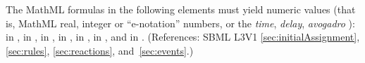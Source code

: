 \removedRule
  {The MathML formulas in the following elements must yield numeric
values (that is, MathML real, integer or ``e-notation'' numbers,
or the \emph{time}, \emph{delay}, \emph{avogadro} ):
 in \KineticLaw,  in
\InitialAssignment,  in \AssignmentRule,  in
\RateRule,  in \AlgebraicRule,  in \Event
\Delay, and  in \EventAssignment.}
  {(References: SBML L3V1 \ref{sec:initialAssignment}, \ref{sec:rules}, \ref{sec:reactions}, and~\ref{sec:events}.)}


